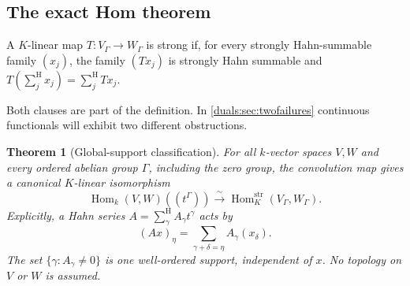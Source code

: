 \documentclass[11pt,letterpaper]{article}
\numberwithin{equation}{section}
\newtheorem{theorem}{Theorem}[section]
\theoremstyle{definition}
\theoremstyle{remark}
\newcommand{\Hom}{\operatorname{Hom}}
\newcommand{\sH}{\mathop{\sum}\nolimits^{\mathrm H}}
\begin{document}
\subsection{The exact Hom theorem}
\begin{definition}
A $K$-linear map $T:V_\Gamma\to W_\Gamma$ is strong if, for every
strongly Hahn-summable family $(x_j)$, the family $(Tx_j)$ is strongly
Hahn summable and $T(\sH_jx_j)=\sH_jTx_j$.
\end{definition}
Both clauses are part of the definition. In \cref{duals:sec:twofailures}
continuous functionals will exhibit two different obstructions.

\begin{theorem}[Global-support classification]\label{duals:thm:strong}
For all $k$-vector spaces $V,W$ and every ordered abelian group
$\Gamma$, including the zero group, the convolution map gives a
canonical $K$-linear isomorphism
\begin{equation}\label{duals:eq:strong-Hom}
 \Hom_k(V,W)((t^\Gamma))
 \xrightarrow{\ \sim\ }
 \Hom_K^{\mathrm{str}}(V_\Gamma,W_\Gamma).
\end{equation}
Explicitly, a Hahn series $A=\sH_\gamma A_\gamma t^\gamma$ acts by
\begin{equation}\label{duals:eq:operator-convolution}
 (A x)_\eta=\sum_{\gamma+\delta=\eta}A_\gamma(x_\delta).
\end{equation}
The set $\{\gamma:A_\gamma\ne0\}$ is one well-ordered support,
independent of $x$. No topology on $V$ or $W$ is assumed.
\end{theorem}
\end{document}

